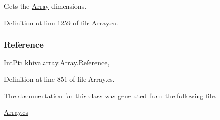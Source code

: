 Gets the \mbox{\hyperlink{classkhiva_1_1array_1_1_array}{Array}} dimensions. 



Definition at line 1259 of file Array.\+cs.

\mbox{\label{classkhiva_1_1array_1_1_array_abfcf232b5b58cb7e4947ea1c10068efa}} 
\subsubsection{\texorpdfstring{Reference}{Reference}}
{\footnotesize\ttfamily Int\+Ptr khiva.\+array.\+Array.\+Reference\hspace{0.3cm}{\ttfamily [get]}, {\ttfamily [set]}}



Definition at line 851 of file Array.\+cs.



The documentation for this class was generated from the following file\+:\begin{DoxyCompactItemize}
\item 
\mbox{\hyperlink{_array_8cs}{Array.\+cs}}\end{DoxyCompactItemize}
